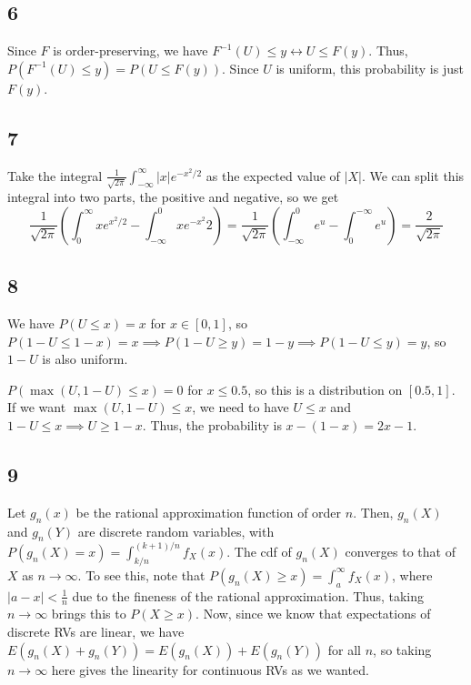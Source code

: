 \documentclass{article}
\begin{document}
\subsection*{6}
Since $F$ is order-preserving, we have $F^{-1}(U)\leq y\longleftrightarrow U\leq F(y)$. Thus, $P(F^{-1}(U)\leq y)=P(U\leq F(y))$. Since $U$ is uniform, this probability is just $F(y)$.
\subsection*{7}
Take the integral $\frac{1}{\sqrt{2\pi}}\int_{-\infty}^\infty|x|e^{-x^2/2}$ as the expected value of $|X|$. We can split this integral into two parts, the positive and negative, so we get
$$\frac{1}{\sqrt{2\pi}}\left(\int_0^\infty xe^{x^2/2}-\int_{-\infty}^0xe^{-x^2}{2}\right)=\frac{1}{\sqrt{2\pi}}\left(\int_{-\infty}^0e^u-\int_0^{-\infty}e^u\right)=\frac{2}{\sqrt{2\pi}}$$
\subsection*{8}
We have $P(U\leq x)=x$ for $x\in[0,1]$, so $P(1-U\leq 1-x)=x\implies P(1-U\geq y)=1-y\implies P(1-U\leq y)=y$, so $1-U$ is also uniform.

$P(\max(U,1-U)\leq x)=0$ for $x\leq0.5$, so this is a distribution on $[0.5,1]$. If we want $\max(U,1-U)\leq x$, we need to have $U\leq x$ and $1-U\leq x\implies U\geq 1-x$. Thus, the probability is $x-(1-x)=2x-1$.
\subsection*{9}
Let $g_n(x)$ be the rational approximation function of order $n$. Then, $g_n(X)$ and $g_n(Y)$ are discrete random variables, with $P(g_n(X)=x)=\int_{k/n}^{(k+1)/n}f_X(x)$. The cdf of $g_n(X)$ converges to that of $X$ as $n\to\infty$. To see this, note that $P(g_n(X)\geq x)=\int_a^\infty f_X(x)$, where $|a-x|<\frac{1}{n}$ due to the fineness of the rational approximation. Thus, taking $n\to\infty$ brings this to $P(X\geq x)$. Now, since we know that expectations of discrete RVs are linear, we have $E(g_n(X)+g_n(Y))=E(g_n(X))+E(g_n(Y))$ for all $n$, so taking $n\to\infty$ here gives the linearity for continuous RVs as we wanted.
\end{document}
